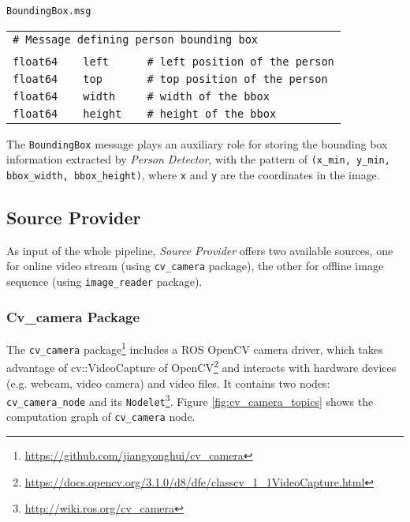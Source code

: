\texttt{BoundingBox.msg}
\begin{table}[H]
\begin{tabular}{|lllll|}
\hline
\multicolumn{5}{|l|}{\texttt{\# Message defining person bounding box}} \\
\multicolumn{5}{|l|}{}                                        \\
\texttt{float64}   &   & \texttt{left}    &   & \texttt{\# left position of the person}  \\
\texttt{float64}   &   & \texttt{top}     &   & \texttt{\# top position of the person}   \\
\texttt{float64}   &   & \texttt{width}   &   & \texttt{\# width of the bbox}            \\
\texttt{float64}   &   & \texttt{height}  &   & \texttt{\# height of the bbox}           \\ \hline
\end{tabular}
\end{table}

The \texttt{BoundingBox} message plays an auxiliary role for storing the bounding box information extracted by \textit{Person Detector}, with the pattern of \texttt{(x\_{min}, y\_{min}, bbox\_width, bbox\_height)}, where \texttt{x} and \texttt{y} are the coordinates in the image. 


\subsection{Source Provider}
\label{pipeline:SP}
As input of the whole pipeline, \textit{Source Provider} offers two available sources, one for online video stream (using \texttt{cv\_camera} package), the other for offline image sequence (using \texttt{image\_reader} package). \\

\subsubsection{Cv\_camera Package} 

The \texttt{cv\_camera} package\footnote{\url{https://github.com/jiangyonghui/cv_camera}} includes a ROS OpenCV camera driver, which takes advantage of cv::VideoCapture of OpenCV\footnote{\url{https://docs.opencv.org/3.1.0/d8/dfe/classcv_1_1VideoCapture.html}} and interacts with hardware devices (e.g. webcam, video camera) and video files. It contains two nodes: \texttt{cv\_camera\_node} and its \texttt{Nodelet}\footnote{\url{http://wiki.ros.org/cv_camera}}. Figure \ref{fig:cv_camera_topics} shows the computation graph of \texttt{cv\_camera} node.

